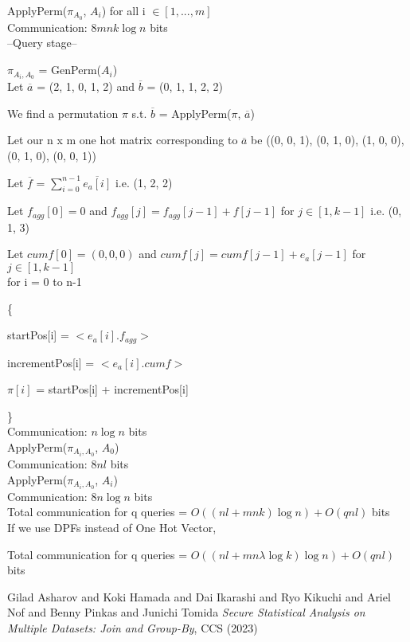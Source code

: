 \textbullet{} ApplyPerm($\pi_{A_0}$, $A_i$) for all i $\in [1, ..., m]$ \\
Communication: $8mnk\log n$ bits \\

--Query stage--

\textbullet{} $\pi_{A_i,A_0}$ = GenPerm($A_i$) \\

Let $\overline{a}$ = (2, 1, 0, 1, 2) and $\overline{b}$ = (0, 1, 1, 2, 2)

We find a permutation $\pi$ s.t. $\overline{b}$ = ApplyPerm($\pi$, $\overline{a}$)

Let our n x m one hot matrix corresponding to $\overline{a}$ be ((0, 0, 1), (0, 1, 0), (1, 0, 0), (0, 1, 0), (0, 0, 1))

Let $\overline{f}$ = $\sum_{i=0}^{n-1} \overline{e_a[i]}$ i.e. (1, 2, 2)

Let $f_{agg}[0] = 0$ and $f_{agg}[j] = f_{agg}[j-1] + f[j-1]$ for $j \in [1, k-1]$ i.e. (0, 1, 3)

Let $cumf[0] = (0, 0, 0)$ and $cumf[j] = cumf[j-1] + e_a[j-1]$ for $j \in [1, k-1]$ \\

for i = 0 to n-1

\{

startPos[i] = $< e_a[i].f_{agg} >$

incrementPos[i] = $< e_a[i].cumf >$

$\pi [i]$ = startPos[i] + incrementPos[i]

\} \\

Communication: $n\log n$ bits \\


\textbullet{} ApplyPerm($\pi_{A_i,A_0}$, $A_0$) \\
Communication: $8nl$ bits \\

\textbullet{} ApplyPerm($\pi_{A_i,A_0}$, $A_i$) \\
Communication: $8n\log n$ bits \\

Total communication for q queries =  $O((nl + mnk)\log n) + O(qnl)$ bits \\

If we use DPFs instead of One Hot Vector,

Total communication for q queries =  $O((nl + mn\lambda \log k)\log n) + O(qnl)$ bits
\begin{thebibliography}{99}

 Gilad Asharov and Koki Hamada and Dai Ikarashi and Ryo Kikuchi and Ariel Nof and Benny Pinkas and Junichi Tomida \emph{Secure Statistical Analysis on Multiple Datasets: Join and Group-By}, {CCS} (2023)

\end{thebibliography}

%
